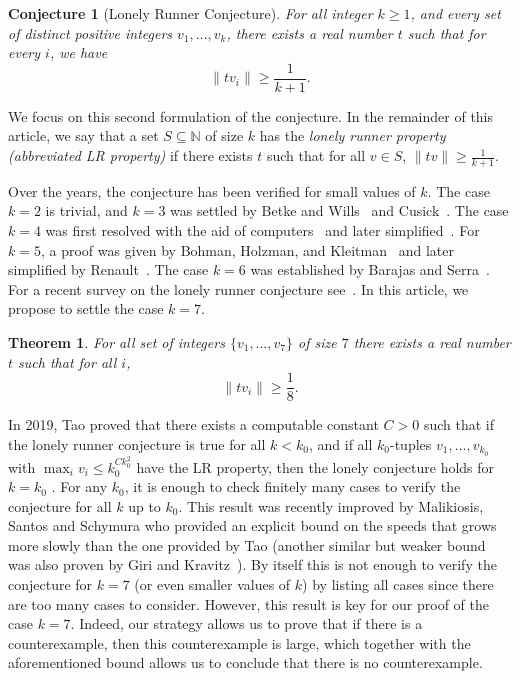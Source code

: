 \documentclass[11pt,a4paper]{article}
\newtheorem{theorem}{Theorem}
\newtheorem{conjecture}{Conjecture}
\theoremstyle{definition}
\theoremstyle{remark}
\begin{document}
\begin{conjecture}[Lonely Runner Conjecture]
For all integer $k \geq 1$, and every set of distinct positive integers $v_1, \ldots, v_{k}$, there exists a real number $t$ such that for every $i$, we have 
\[
  \|tv_i\| \geq \frac{1}{k+1}.
\]
\end{conjecture}
We focus on this second formulation of the conjecture. In the remainder of this article, we say that a set $S\subseteq\mathbb{N}$ of size $k$ has the \emph{lonely runner property (abbreviated LR property)} if there exists $t$ such that for all $v\in S$, $\|tv\| \geq \frac{1}{k+1}.$

Over the years, the conjecture has been verified for small values of $k$. The case $k=2$ is trivial, and $k=3$ was settled by Betke and Wills~\cite{Betke1972Jun} and Cusick~\cite{Cusick1973, Cusick1974Jan, Cusick1982Jan}. The case $k=4$ was first resolved with the aid of computers~\cite{Cusick1984Oct} and later simplified~\cite{Bienia1998Jan}. For $k=5$, a proof was given by Bohman, Holzman, and Kleitman~\cite{Bohman2001Feb} and later simplified by Renault~\cite{Renault2004Oct}. The case $k=6$ was established by Barajas and Serra~\cite{Barajas2008Mar}. For a recent survey on the lonely runner conjecture see~\cite{Perarnau2025Nov}. In this article, we propose to settle the case $k=7$.
\begin{theorem}\label{thm:8runners}
For all set of integers $\{v_1,\ldots, v_7\}$ of size $7$ there exists a real number $t$ such that for all $i$,
\[
\|tv_i\| \geq \frac{1}{8}.
\]
\end{theorem}

In 2019, Tao proved that there exists a computable constant $C>0$ such that if the lonely runner conjecture is true for all $k<k_0$, and if all $k_0$-tuples $v_1,\ldots, v_{k_0}$ with $\max_i v_i\le k_0^{C k_0^2}$ have the LR property, then the lonely conjecture holds for $k=k_0$ \cite{Tao2018Dec}. For any $k_0$, it is enough to check finitely many cases to verify the conjecture for all $k$ up to $k_0$. This result was recently improved by Malikiosis, Santos and Schymura who provided an explicit bound on the speeds that grows more slowly than the one provided by Tao \cite{Malikiosis2024Nov} (another similar but weaker bound was also proven by Giri and Kravitz~\cite{Giri2023Apr}). By itself this is not enough to verify the conjecture for $k=7$ (or even smaller values of $k$) by listing all cases since there are too many cases to consider. However, this result is key for our proof of the case $k=7$. Indeed, our strategy allows us to prove that if there is a counterexample, then this counterexample is large, which together with the aforementioned bound allows us to conclude that there is no counterexample.
\end{document}
